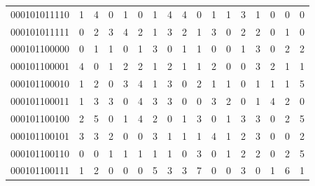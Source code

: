 \documentclass[10pt,a4paper]{article}
\begin{document}
\begin{longtable}{ |c|c|c|c|c|c|c|c|c|c|c|c|c|c|c|c|c| }
    000101011110              & 1                            & 4                                & 0                            & 1                              & 0   & 1   & 4   & 4   & 0   & 1   & 1   & 3   & 1   & 0   & 0   & 0   \\
    000101011111              & 0                            & 2                                & 3                            & 4                              & 2   & 1   & 3   & 2   & 1   & 3   & 0   & 2   & 2   & 0   & 1   & 0   \\
    000101100000              & 0                            & 1                                & 1                            & 0                              & 1   & 3   & 0   & 1   & 1   & 0   & 0   & 1   & 3   & 0   & 2   & 2   \\
    000101100001              & 4                            & 0                                & 1                            & 2                              & 2   & 1   & 2   & 1   & 1   & 2   & 0   & 0   & 3   & 2   & 1   & 1   \\
    000101100010              & 1                            & 2                                & 0                            & 3                              & 4   & 1   & 3   & 0   & 2   & 1   & 1   & 0   & 1   & 1   & 1   & 5   \\
    000101100011              & 1                            & 3                                & 3                            & 0                              & 4   & 3   & 3   & 0   & 0   & 3   & 2   & 0   & 1   & 4   & 2   & 0   \\
    000101100100              & 2                            & 5                                & 0                            & 1                              & 4   & 2   & 0   & 1   & 3   & 0   & 1   & 3   & 3   & 0   & 2   & 5   \\
    000101100101              & 3                            & 3                                & 2                            & 0                              & 0   & 3   & 1   & 1   & 1   & 4   & 1   & 2   & 3   & 0   & 0   & 2   \\
    000101100110              & 0                            & 0                                & 1                            & 1                              & 1   & 1   & 1   & 0   & 3   & 0   & 1   & 2   & 2   & 0   & 2   & 5   \\
    000101100111              & 1                            & 2                                & 0                            & 0                              & 0   & 5   & 3   & 3   & 7   & 0   & 0   & 3   & 0   & 1   & 6   & 1   \\

\end{longtable}
\end{document}
